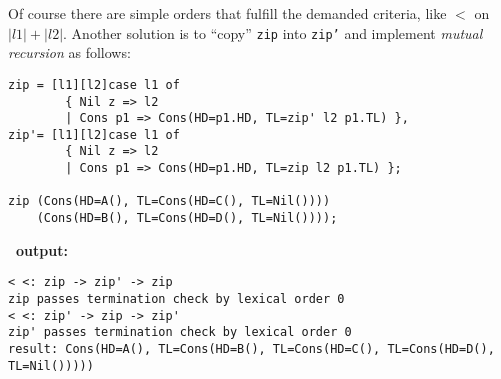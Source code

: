 Of course there are simple orders
that fulfill the demanded criteria, like $<$ on {$|l1|+|l2|$}.
Another solution is to ``copy'' {\tt zip} into {\tt zip'} and implement
{\em mutual recursion} as follows:
\begin{verbatim}
zip = [l1][l2]case l1 of
        { Nil z => l2
        | Cons p1 => Cons(HD=p1.HD, TL=zip' l2 p1.TL) },
zip'= [l1][l2]case l1 of
        { Nil z => l2
        | Cons p1 => Cons(HD=p1.HD, TL=zip l2 p1.TL) };

zip (Cons(HD=A(), TL=Cons(HD=C(), TL=Nil())))
    (Cons(HD=B(), TL=Cons(HD=D(), TL=Nil())));
\end{verbatim}
{\bf \foetus\ output:}\nopagebreak
\begin{verbatim}
< <: zip -> zip' -> zip
zip passes termination check by lexical order 0
< <: zip' -> zip -> zip'
zip' passes termination check by lexical order 0
result: Cons(HD=A(), TL=Cons(HD=B(), TL=Cons(HD=C(), TL=Cons(HD=D(),
TL=Nil()))))
\end{verbatim}


